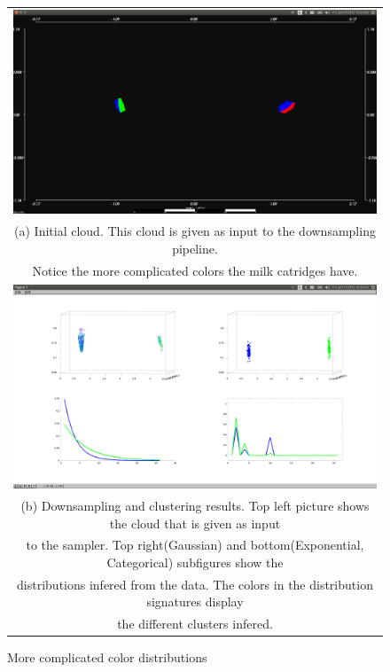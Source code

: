 \documentclass[twoside,hidelinks]{article}
\begin{document}
\begin{figure}
\begin{tabular}{c}
  \includegraphics[width=1\textwidth]{clusterings/coloursSource} \\
  (a) Initial cloud. This cloud is given as input to the downsampling pipeline.    \\
   Notice the more complicated colors the milk catridges have. \\
   \includegraphics[width=1\textwidth]{clusterings/coloursCorrect} \\
 (b) Downsampling and clustering results. Top left picture shows the cloud that is given as input\\
 to the sampler. Top right(Gaussian) and bottom(Exponential, Categorical) subfigures show the \\
 distributions infered from the data. The colors in the distribution signatures display \\
 the different clusters infered.\end{tabular}
\caption{More complicated color distributions}
  \label{pcl:clust2}
\end{figure}
\end{document}
